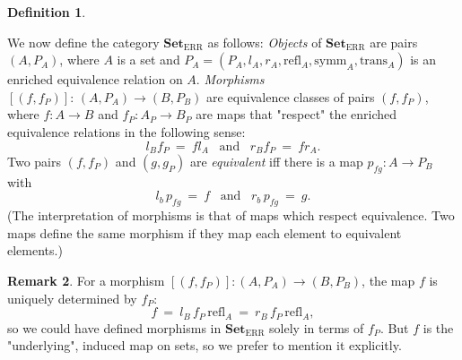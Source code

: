 \documentclass[12pt,a4paper,twoside]{article}
\newlength{\abstand}
\def\Set{{\mathbf{Set}}}
\def\SetEER{{\Set_{\text{ERR}}}}
\def\refl{{\text{refl}}}
\def\symm{{\text{symm}}}
\def\trans{{\text{trans}}}
\theoremstyle{definition}
\newtheorem{defi}{Definition}[section]
\newtheorem{rem}[defi]{Remark}
\begin{document}
\begin{defi}
\begin{enumerate}
            We now define the category $\SetEER$ as follows: \emph{Objects}
            of $\SetEER$ are pairs $(A,P_A)$, where $A$ is a set
            and $P_A=(P_A,l_A,r_A,\refl_A,\symm_A,\trans_A)$ 
            is an enriched equivalence relation on $A$.
            \emph{Morphisms} $\left[(f,f_P)\right]:\,(A,P_A)\rightarrow(B,P_B)$
            are equivalence classes of pairs $(f,f_P)$, where
            $f:A\rightarrow B$ and $f_P:A_P\rightarrow B_P$ are maps that
            "respect" the enriched equivalence relations in the following sense:
            \[
                l_Bf_P\ =\ fl_A
                \;\;\;\text{and}\;\;\;
                r_Bf_P\ =\ fr_A.
            \]
            Two pairs $(f,f_P)$ and $(g,g_P)$ are \emph{equivalent} iff
            there is a map $p_{fg}:A\rightarrow P_B$ with
            \[
                l_b\,p_{fg}\ =\ f
                \;\;\;\text{and}\;\;\;
                r_b\,p_{fg}\ =\ g.
            \]
            (The interpretation of morphisms is that of maps which
            respect equivalence. Two maps define the same morphism if they map
            each element to equivalent elements.)
    \end{enumerate}
\end{defi}

\vspace{\abstand}

\begin{rem}\label{remfsuperfluous}
    For a morphism $[(f,f_P)]:(A,P_A)\rightarrow(B,P_B)$, the map $f$
    is uniquely determined by $f_P$:
    \[
        f\ =\ 
        l_B\,f_P\,\refl_A\ =\ 
        r_B\,f_P\,\refl_A,
    \]
    so we could have defined morphisms in $\SetEER$ solely in terms of $f_P$.
    But $f$ is the "underlying", induced map on sets, so we prefer to mention
    it explicitly.
\end{rem}

\vspace{\abstand}




\end{document}
